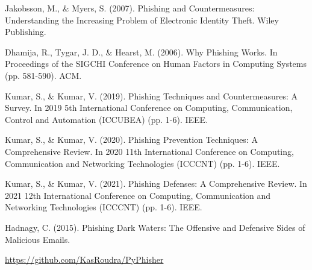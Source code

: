 \documentclass[openany]{report}
\begin{document}
\clearpage
\begin{thebibliography}{10}
    Jakobsson, M., \& Myers, S. (2007). Phishing and Countermeasures: Understanding the Increasing Problem of Electronic Identity Theft. Wiley Publishing.

    Dhamija, R., Tygar, J. D., \& Hearst, M. (2006). Why Phishing Works. In Proceedings of the SIGCHI Conference on Human Factors in Computing Systems (pp. 581-590). ACM.

    Kumar, S., \& Kumar, V. (2019). Phishing Techniques and Countermeasures: A Survey. In 2019 5th International Conference on Computing, Communication, Control and Automation (ICCUBEA) (pp. 1-6). IEEE.

    Kumar, S., \& Kumar, V. (2020). Phishing Prevention Techniques: A Comprehensive Review. In 2020 11th International Conference on Computing, Communication and Networking Technologies (ICCCNT) (pp. 1-6). IEEE.

    Kumar, S., \& Kumar, V. (2021). Phishing Defenses: A Comprehensive Review. In 2021 12th International Conference on Computing, Communication and Networking Technologies (ICCCNT) (pp. 1-6). IEEE.

    Hadnagy, C. (2015). Phishing Dark Waters: The Offensive and Defensive Sides of Malicious Emails.

    \url{https://github.com/KasRoudra/PyPhisher}
\end{thebibliography}
\end{document}
